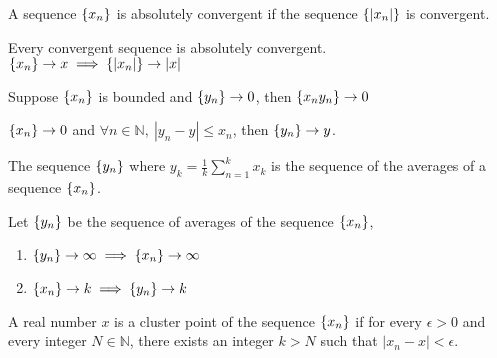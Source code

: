 
	\begin{definition}
		A sequence $\{x_n\}$ is absolutely convergent if the sequence $\{|x_n|\}$ is convergent.
	\end{definition}

	\begin{remark}
		Every convergent sequence is absolutely convergent.\\
		$\{x_n\} \to x \implies \{|x_n|\} \to |x|$
	\end{remark}

	\begin{remark}
		Suppose $\{x_n\}$ is bounded and $\{y_n\} \to 0$, then $\{x_n y_n\} \to 0$
	\end{remark}
	
	\begin{remark}
		$\{x_n\} \to 0$ and $\forall n \in \mathbb{N},\ |y_n-y| \le x_n$, then $\{y_n\} \to y$.
	\end{remark}

	\begin{definition}
		The sequence $\{y_n\}$ where $y_k = \frac{1}{k} \sum_{n=1}^k x_k$ is the sequence of the averages of a sequence $\{x_n\}$.
	\end{definition}

	\begin{remark}Let $\{y_n\}$ be the sequence of averages of the sequence $\{x_n\}$,
		\begin{enumerate}	
			\item $\{y_n\} \to \infty \implies \{x_n\} \to \infty$
			\item $\{x_n\} \to k \implies \{y_n\} \to k$
		\end{enumerate}
	\end{remark}

	\begin{definition}
		A real number $x$ is a cluster point of the sequence $\{x_n\}$ if for every $\epsilon > 0$ and every integer $N \in \mathbb{N}$, there exists an integer $k > N$ such that $|x_n - x| < \epsilon$.
	\end{definition}

